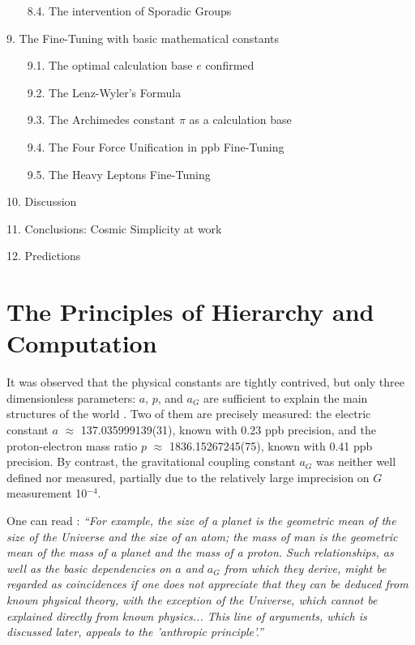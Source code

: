 \documentclass[twoside,draft]{article}
\begin{document}
\begin{sloppypar}
~~~    8.4. The intervention of Sporadic Groups
   
 9. The Fine-Tuning with basic mathematical constants
 
~~~    9.1. The optimal calculation base $e$ confirmed
   
~~~    9.2. The Lenz-Wyler's Formula
   
~~~    9.3. The Archimedes constant $\pi$ as a calculation base
   
~~~    9.4. The Four Force Unification in ppb Fine-Tuning
   
~~~    9.5. The Heavy Leptons Fine-Tuning
   
 10. Discussion
 
 11. Conclusions: Cosmic Simplicity at work
 
 12. Predictions
    
\section{The Principles of Hierarchy and Computation}

It was observed that the physical constants are tightly contrived, but only three dimensionless parameters: $a$, $p$, and $a_{G}$ are sufficient to explain the main structures of the world \cite{Carr}. Two of them are precisely measured: the electric constant $a$ $\approx$ 137.035999139(31), known with 0.23 ppb precision, and the proton-electron mass ratio $p$ $\approx$ 1836.15267245(75), known with 0.41 ppb precision. By contrast, the gravitational coupling constant $a_{G}$ was neither well defined nor measured, partially due to the relatively large imprecision on $G$ measurement 10$^{-4}\!$.

One can read \cite{Carr}: \textit{“For example, the size of a planet is the geometric mean of the size of the Universe and the size of an atom; the mass of man is the geometric mean of the mass of a planet and the mass of a proton. Such relationships, as well as the basic dependencies on $a$ and $a_G$ from which they derive, might be regarded as coincidences if one does not appreciate that they can be deduced from known physical theory, with the exception of the Universe, which cannot be explained directly from known physics... This line of arguments, which is discussed later, appeals to the 'anthropic principle'.”}


\end{sloppypar}
\end{document}
